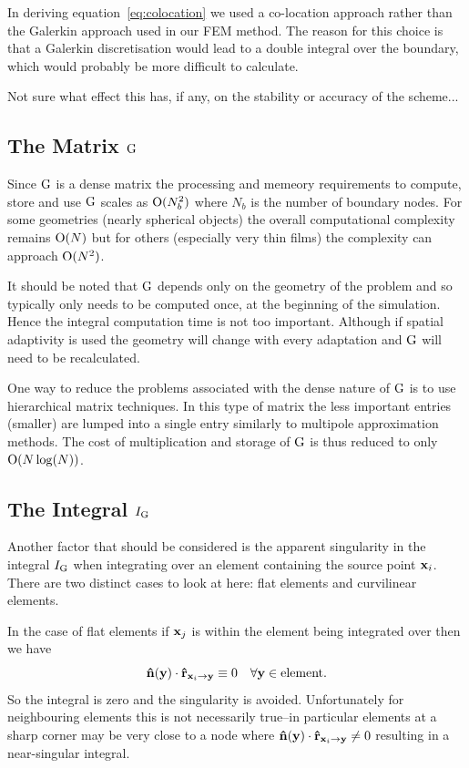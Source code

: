 In deriving equation~\eqref{eq:colocation} we used a co-location approach rather than the Galerkin approach used in our FEM method.
The reason for this choice is that a Galerkin discretisation would lead to a double integral over the boundary, which would probably be more difficult to calculate.

Not sure what effect this has, if any, on the stability or accuracy of the scheme...


\subsection{The Matrix ${\mathbf{\mathrm{G}}}$}
Since ${\mathbf{\mathrm{G}}}$ is a dense matrix the processing and memeory requirements to compute, store and use ${\mathbf{\mathrm{G}}}$ scales as $\text{O}(N_b^2)$ where $N_b$ is the number of boundary nodes. For some geometries (\eg nearly spherical objects) the overall computational complexity remains $\text{O}(N)$ but for others (especially very thin films) the complexity can approach $\text{O}(N^2)$.

It should be noted that ${\mathbf{\mathrm{G}}}$ depends only on the geometry of the problem and so typically only needs to be computed once, at the beginning of the simulation. Hence the integral computation time is not too important. Although if spatial adaptivity is used the geometry will change with every adaptation and ${\mathbf{\mathrm{G}}}$ will need to be recalculated.

One way to reduce the problems associated with the dense nature of ${\mathbf{\mathrm{G}}}$ is to use hierarchical matrix techniques. In this type of matrix the less important entries (\ie smaller) are lumped into a single entry similarly to multipole approximation methods. The cost of multiplication and storage of ${\mathbf{\mathrm{G}}}$ is thus reduced to only $\text{O}(N \log(N))$.\cite{Knittel2009}

\subsection{The Integral $I_{\mathbf{\mathrm{G}}}$}
Another factor that should be considered is the apparent singularity in the integral $I_{\mathbf{\mathrm{G}}}$ when integrating over an element containing the source point $\mathbf{x}_{i}$. There are two distinct cases to look at here: flat elements and curvilinear elements.

In the case of flat elements if $\mathbf{x}_{j}$ is within the element being integrated over then we have
\begin{equation}
  \label{eq:7}
  \mathbf{\hat{n}}(\mathbf{y}) \cdot \mathbf{\hat{r}}_{\mathbf{x}_{{i}} \rightarrow \mathbf{y}} \equiv 0 \quad \forall \mathbf{y} \in \text{element}.
\end{equation}
So the integral is zero and the singularity is avoided. Unfortunately for neighbouring elements this is not necessarily true--in particular elements at a sharp corner may be very close to a node where $\mathbf{\hat{n}}(\mathbf{y}) \cdot \mathbf{\hat{r}}_{\mathbf{x}_{{i}} \rightarrow \mathbf{y}} \neq 0$ resulting in a near-singular integral.

